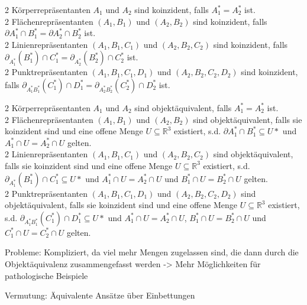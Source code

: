     	\begin{dfn}[Koinzidenz]
    		2 Körperrepräsentanten $A_1$ und $A_2$ sind koinzident, falls $A_1^* = A_2^*$ ist. \\
    		2 Flächenrepräsentanten $(A_1, B_1)$ und $(A_2, B_2)$ sind koinzident, falls $\partial A_1^* \cap B_1^* = \partial A_2^* \cap B_2^*$ ist.\\
    		2 Linienrepräsentanten $(A_1, B_1, C_1)$ und $(A_2, B_2, C_2)$ sind koinzident, falls $\partial_{A_1^*}(B_1^*) \cap C_1^* = \partial_{A_2^*}(B_2^*) \cap C_2^*$ ist.\\
    		2 Punktrepräsentanten $(A_1, B_1, C_1, D_1)$ und $(A_2, B_2, C_2, D_2)$ sind koinzident, falls $\partial_{A_1^*B_1^*}(C_1^*) \cap D_1^*  = \partial_{A_2^*B_2^*}(C_2^*) \cap D_2^*$ ist.\\	
    	\end{dfn}
    	
    	\begin{dfn}[Objektäquivalenz]
    		2 Körperrepräsentanten $A_1$ und $A_2$ sind objektäquivalent, falls $A_1^* = A_2^*$ ist. \\
    		2 Flächenrepräsentanten $(A_1, B_1)$ und $(A_2, B_2)$ sind objektäquivalent, falls sie koinzident sind und eine offene Menge $U \subseteq \mathbb{R}^3$ existiert, s.d. $\partial A_1^* \cap B_1^* \subseteq U*$ und $A_1^* \cap U = A_2^* \cap U$ gelten.\\
    		2 Linienrepräsentanten $(A_1, B_1, C_1)$ und $(A_2, B_2, C_2)$ sind objektäquivalent, falls sie koinzident sind und eine offene Menge $U \subseteq \mathbb{R}^3$ existiert, s.d. $\partial_{A_1^*}(B_1^*) \cap C_1^* \subseteq U*$ und $A_1^* \cap U = A_2^* \cap U$ und $B_1^* \cap U = B_2^* \cap U$ gelten.\\
    		2 Punktrepräsentanten $(A_1, B_1, C_1, D_1)$ und $(A_2, B_2, C_2, D_2)$ sind objektäquivalent, falls sie koinzident sind und eine offene Menge $U \subseteq \mathbb{R}^3$ existiert, s.d. $\partial_{A_1^*B_1^*}(C_1^*) \cap D_1^* \subseteq U*$ und $A_1^* \cap U = A_2^* \cap U$, $B_1^* \cap U = B_2^* \cap U$ und $C_1^* \cap U = C_2^* \cap U$ gelten.
    	\end{dfn}
    	
    	Probleme: Kompliziert, da viel mehr Mengen zugelassen sind, die dann durch die Objektäquivalenz zusammengefasst werden -> Mehr Möglichkeiten für pathologische Beispiele
    	
    	Vermutung: Äquivalente Ansätze über Einbettungen
    	
    	
